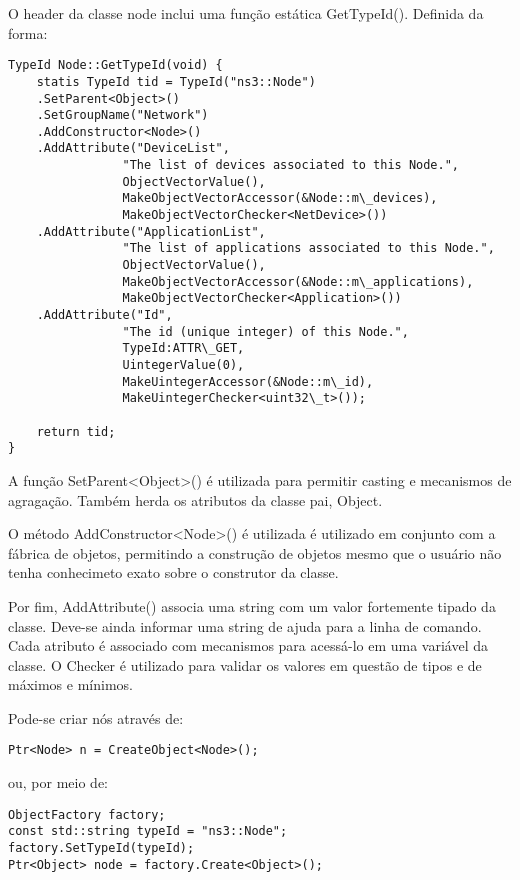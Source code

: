 \documentclass[14pt]{extarticle}
\begin{document}
O header da classe node inclui uma função estática GetTypeId(). Definida da forma:

\begin{lstlisting}
TypeId Node::GetTypeId(void) {
    statis TypeId tid = TypeId("ns3::Node")
    .SetParent<Object>()
    .SetGroupName("Network")
    .AddConstructor<Node>()
    .AddAttribute("DeviceList",
                "The list of devices associated to this Node.",
                ObjectVectorValue(),
                MakeObjectVectorAccessor(&Node::m\_devices),
                MakeObjectVectorChecker<NetDevice>())
    .AddAttribute("ApplicationList",
                "The list of applications associated to this Node.",
                ObjectVectorValue(),
                MakeObjectVectorAccessor(&Node::m\_applications),
                MakeObjectVectorChecker<Application>())
    .AddAttribute("Id",
                "The id (unique integer) of this Node.",
                TypeId:ATTR\_GET,
                UintegerValue(0),
                MakeUintegerAccessor(&Node::m\_id),
                MakeUintegerChecker<uint32\_t>());

    return tid;
}
\end{lstlisting}

A função SetParent<Object>() é utilizada para permitir casting e mecanismos de agragação. Também herda os atributos da
classe pai, Object.

O método AddConstructor<Node>() é utilizada é utilizado em conjunto com a fábrica de objetos, permitindo a construção de
objetos mesmo que o usuário não tenha conhecimeto exato sobre o construtor da classe.

Por fim, AddAttribute() associa uma string com um valor fortemente tipado da classe. Deve-se ainda informar uma string
de ajuda para a linha de comando. Cada atributo é associado com mecanismos para acessá-lo em uma variável da classe. O
Checker é utilizado para validar os valores em questão de tipos e de máximos e mínimos.

Pode-se criar nós através de:

\begin{lstlisting}
Ptr<Node> n = CreateObject<Node>();
\end{lstlisting}

ou, por meio de:

\begin{lstlisting}
ObjectFactory factory;
const std::string typeId = "ns3::Node";
factory.SetTypeId(typeId);
Ptr<Object> node = factory.Create<Object>();
\end{lstlisting}
\end{document}
